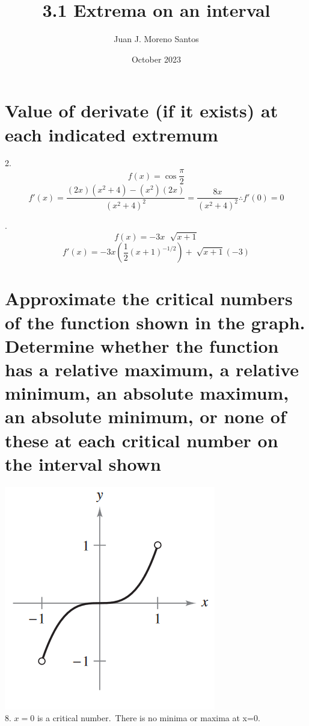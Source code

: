 \documentclass[11pt]{article}
\title{3.1 Extrema on an interval}
\author{Juan J. Moreno Santos}
\date{October 2023}
\begin{document}
\maketitle

\section{Value of derivate (if it exists) at each indicated extremum}
2.\[f(x)=\cos\frac{\pi}{2}\]
\[f'(x)=\frac{(2x)(x^2+4)-(x^2)(2x)}{(x^2+4)^2}=\frac{8x}{(x^2+4)^2}\therefore f'(0)=0\]

\vspace{1cm}
.\[f(x)=-3x\,\,\sqrt[]{x+1}\]
\[f'(x)=-3x\left(\frac{1}{2}{(x+1)}^{-1/2}\right)+\sqrt[]{x+1}(-3)\]

\noindent
\section{Approximate the critical numbers of the function shown in the graph. Determine whether the function has a relative maximum, a relative minimum, an absolute maximum, an absolute minimum, or none of these at each critical number on the interval shown}
\includegraphics{8.png}\\
8. $x=0$ is a critical number.\ There is no minima or maxima at x=0.
\end{document}
